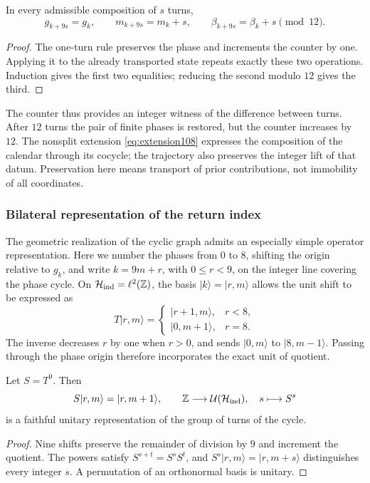 \begin{proposition}
\label{mono-ampl:vueltas}
In every admissible composition of \(s\) turns,
\[
 g_{k+9s}=g_k,\qquad m_{k+9s}=m_k+s,\qquad
 \beta_{k+9s}=\beta_k+s\pmod{12}.
\]
\end{proposition}
\begin{proof}
The one-turn rule preserves the phase and increments the counter by one.
Applying it to the already transported state repeats exactly these
two operations. Induction gives the first two equalities; reducing the
second modulo \(12\) gives the third.
\end{proof}

The counter thus provides an integer witness of the difference between
turns. After \(12\) turns the pair of finite phases is restored, but
the counter increases by \(12\). The nonsplit extension
\eqref{eq:extension108} expresses the composition of the calendar through its
cocycle; the trajectory also preserves the integer lift of that datum.
Preservation here means transport of prior contributions,
not immobility of all coordinates.

\subsubsection{Bilateral representation of the return index}

The geometric realization of the cyclic graph admits an especially simple
operator representation. Here we number the phases from \(0\) to
\(8\), shifting the origin relative to \(g_k\), and
write \(k=9m+r\), with \(0\leq r<9\), on the integer line
covering the phase cycle. On
\(\mathcal H_{\rm ind}=\ell^2(\mathbb Z)\), the basis
\(|k\rangle=|r,m\rangle\) allows the unit shift to be expressed as
\[
 T|r,m\rangle=
 \begin{cases}
 |r+1,m\rangle,&r<8,\\
 |0,m+1\rangle,&r=8.
 \end{cases}
\]
The inverse decreases \(r\) by one when \(r>0\), and sends
\(|0,m\rangle\) to \(|8,m-1\rangle\). Passing through the phase origin
therefore incorporates the exact unit of quotient.

\begin{proposition}
\label{mono-ampl:representacion}
Let \(S=T^9\). Then
\[
 S|r,m\rangle=|r,m+1\rangle,\qquad
 \mathbb Z\longrightarrow\mathcal U(\mathcal H_{\rm ind}),
 \quad s\longmapsto S^s
\]
is a faithful unitary representation of the group of turns of the cycle.
\end{proposition}
\begin{proof}
Nine shifts preserve the remainder of division by \(9\) and
increment the quotient. The powers satisfy
\(S^{s+t}=S^sS^t\), and \(S^s|r,m\rangle=|r,m+s\rangle\) distinguishes
every integer \(s\). A permutation of an orthonormal basis is unitary.
\end{proof}

